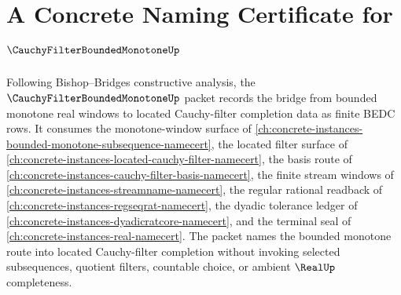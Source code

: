\chapter{A Concrete Naming Certificate for $\CauchyFilterBoundedMonotoneUp$}
\label{ch:concrete-instances-cauchy-filter-bounded-monotone-namecert}

Following Bishop--Bridges constructive analysis, the $\CauchyFilterBoundedMonotoneUp$ packet records the bridge from bounded monotone real windows to located Cauchy-filter completion data as finite BEDC rows. It consumes the monotone-window surface of \autoref{ch:concrete-instances-bounded-monotone-subsequence-namecert}, the located filter surface of \autoref{ch:concrete-instances-located-cauchy-filter-namecert}, the basis route of \autoref{ch:concrete-instances-cauchy-filter-basis-namecert}, the finite stream windows of \autoref{ch:concrete-instances-streamname-namecert}, the regular rational readback of \autoref{ch:concrete-instances-regseqrat-namecert}, the dyadic tolerance ledger of \autoref{ch:concrete-instances-dyadicratcore-namecert}, and the terminal seal of \autoref{ch:concrete-instances-real-namecert}. The packet names the bounded monotone route into located Cauchy-filter completion without invoking selected subsequences, quotient filters, countable choice, or ambient $\RealUp$ completeness.

